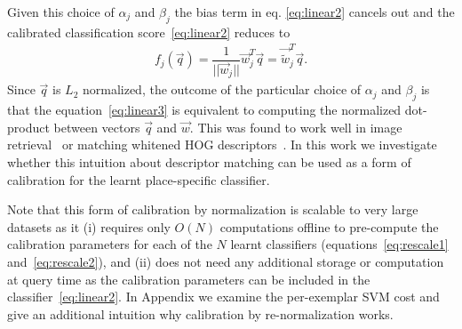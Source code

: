     Given this choice of $\alpha_j$ and $\beta_j$ 
    \textcolor{petr}{
      the bias term in eq. \eqref{eq:linear2} cancels out and
    }
    the calibrated classification score~\eqref{eq:linear2} reduces to
      \begin{align}
        f_j(\vec{q}) = \dfrac{1}{||\vec{w}_j||}\vec{w}_j^T\vec{q} = \vec{\widetilde{w}}_j^T\vec{q}.
        \label{eq:linear3}
      \end{align}
    \textcolor{petr}{
      Since $\vec{q}$ is $L_2$ normalized, the outcome of the particular choice of $\alpha_j$ and $\beta_j$ is that the equation~\eqref{eq:linear3} is equivalent to computing the normalized dot-product between vectors $\vec{q}$ and $\vec{w}$.
    }
    This was found to work well in image retrieval~\cite{Sivic03} or matching whitened HOG descriptors~\cite{Doersch13}.
    In this work we investigate whether this intuition about descriptor matching can be used as a form of calibration for the learnt place-specific classifier. 


    Note  that this form of calibration by normalization is scalable to very large datasets as it (i) requires only $O(N)$ computations offline to pre-compute the calibration parameters for each of the $N$ learnt classifiers (equations~\eqref{eq:rescale1} and~\eqref{eq:rescale2}), and (ii) does not need any additional storage or computation at query time as the calibration parameters can be included in the classifier~\eqref{eq:linear2}. In Appendix we examine the per-exemplar SVM cost and give an additional intuition why calibration by re-normalization works.



